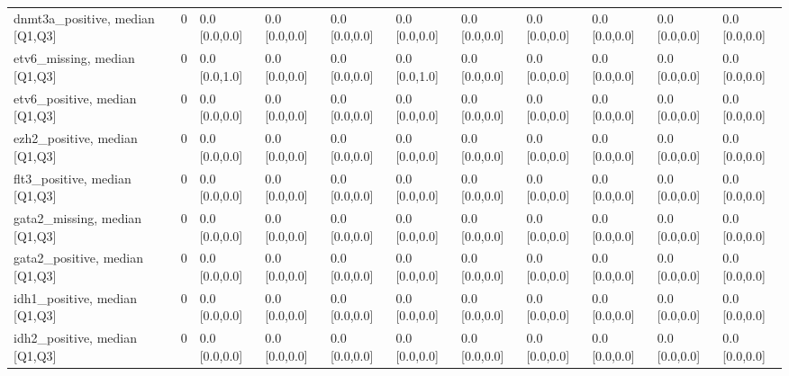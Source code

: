 \begin{tabular}{llllllllllll}
dnmt3a\_positive, median [Q1,Q3] &    &                    0 &       0.0 [0.0,0.0] &      0.0 [0.0,0.0] &        0.0 [0.0,0.0] &       0.0 [0.0,0.0] &     0.0 [0.0,0.0] &     0.0 [0.0,0.0] &     0.0 [0.0,0.0] &       0.0 [0.0,0.0] &        0.0 [0.0,0.0] \\
etv6\_missing, median [Q1,Q3] &    &                    0 &       0.0 [0.0,1.0] &      0.0 [0.0,0.0] &        0.0 [0.0,0.0] &       0.0 [0.0,1.0] &     0.0 [0.0,0.0] &     0.0 [0.0,0.0] &     0.0 [0.0,0.0] &       0.0 [0.0,0.0] &        0.0 [0.0,0.0] \\
etv6\_positive, median [Q1,Q3] &    &                    0 &       0.0 [0.0,0.0] &      0.0 [0.0,0.0] &        0.0 [0.0,0.0] &       0.0 [0.0,0.0] &     0.0 [0.0,0.0] &     0.0 [0.0,0.0] &     0.0 [0.0,0.0] &       0.0 [0.0,0.0] &        0.0 [0.0,0.0] \\
ezh2\_positive, median [Q1,Q3] &    &                    0 &       0.0 [0.0,0.0] &      0.0 [0.0,0.0] &        0.0 [0.0,0.0] &       0.0 [0.0,0.0] &     0.0 [0.0,0.0] &     0.0 [0.0,0.0] &     0.0 [0.0,0.0] &       0.0 [0.0,0.0] &        0.0 [0.0,0.0] \\
flt3\_positive, median [Q1,Q3] &    &                    0 &       0.0 [0.0,0.0] &      0.0 [0.0,0.0] &        0.0 [0.0,0.0] &       0.0 [0.0,0.0] &     0.0 [0.0,0.0] &     0.0 [0.0,0.0] &     0.0 [0.0,0.0] &       0.0 [0.0,0.0] &        0.0 [0.0,0.0] \\
gata2\_missing, median [Q1,Q3] &    &                    0 &       0.0 [0.0,0.0] &      0.0 [0.0,0.0] &        0.0 [0.0,0.0] &       0.0 [0.0,0.0] &     0.0 [0.0,0.0] &     0.0 [0.0,0.0] &     0.0 [0.0,0.0] &       0.0 [0.0,0.0] &        0.0 [0.0,0.0] \\
gata2\_positive, median [Q1,Q3] &    &                    0 &       0.0 [0.0,0.0] &      0.0 [0.0,0.0] &        0.0 [0.0,0.0] &       0.0 [0.0,0.0] &     0.0 [0.0,0.0] &     0.0 [0.0,0.0] &     0.0 [0.0,0.0] &       0.0 [0.0,0.0] &        0.0 [0.0,0.0] \\
idh1\_positive, median [Q1,Q3] &    &                    0 &       0.0 [0.0,0.0] &      0.0 [0.0,0.0] &        0.0 [0.0,0.0] &       0.0 [0.0,0.0] &     0.0 [0.0,0.0] &     0.0 [0.0,0.0] &     0.0 [0.0,0.0] &       0.0 [0.0,0.0] &        0.0 [0.0,0.0] \\
idh2\_positive, median [Q1,Q3] &    &                    0 &       0.0 [0.0,0.0] &      0.0 [0.0,0.0] &        0.0 [0.0,0.0] &       0.0 [0.0,0.0] &     0.0 [0.0,0.0] &     0.0 [0.0,0.0] &     0.0 [0.0,0.0] &       0.0 [0.0,0.0] &        0.0 [0.0,0.0] \\

\end{tabular}
